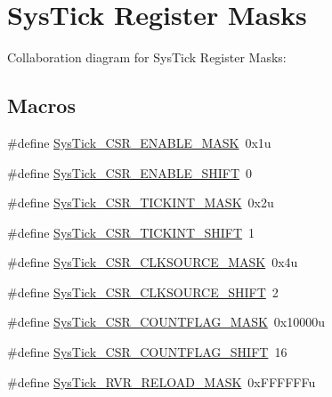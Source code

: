 \hypertarget{group___sys_tick___register___masks}{}\section{Sys\+Tick Register Masks}
\label{group___sys_tick___register___masks}
Collaboration diagram for Sys\+Tick Register Masks\+:
\subsection*{Macros}
\begin{DoxyCompactItemize}
\item 
\#define \hyperlink{group___sys_tick___register___masks_gac780b47ad7830f8b054650cf9ae10600}{Sys\+Tick\+\_\+\+C\+S\+R\+\_\+\+E\+N\+A\+B\+L\+E\+\_\+\+M\+A\+SK}~0x1u
\item 
\#define \hyperlink{group___sys_tick___register___masks_ga0f710afc23630b3797a50a76beec3418}{Sys\+Tick\+\_\+\+C\+S\+R\+\_\+\+E\+N\+A\+B\+L\+E\+\_\+\+S\+H\+I\+FT}~0
\item 
\#define \hyperlink{group___sys_tick___register___masks_ga8b51f1d83c7a482e111b09e4c5964a2b}{Sys\+Tick\+\_\+\+C\+S\+R\+\_\+\+T\+I\+C\+K\+I\+N\+T\+\_\+\+M\+A\+SK}~0x2u
\item 
\#define \hyperlink{group___sys_tick___register___masks_ga7fc911092251c68f56bc4d2e68ffa0b2}{Sys\+Tick\+\_\+\+C\+S\+R\+\_\+\+T\+I\+C\+K\+I\+N\+T\+\_\+\+S\+H\+I\+FT}~1
\item 
\#define \hyperlink{group___sys_tick___register___masks_ga7e5a1e63ec805119d87e8584a2404831}{Sys\+Tick\+\_\+\+C\+S\+R\+\_\+\+C\+L\+K\+S\+O\+U\+R\+C\+E\+\_\+\+M\+A\+SK}~0x4u
\item 
\#define \hyperlink{group___sys_tick___register___masks_ga99922ae5d9a4c34aa9e2c1673c65d8a4}{Sys\+Tick\+\_\+\+C\+S\+R\+\_\+\+C\+L\+K\+S\+O\+U\+R\+C\+E\+\_\+\+S\+H\+I\+FT}~2
\item 
\#define \hyperlink{group___sys_tick___register___masks_ga5ae827629fd47e5a050f706576f7b425}{Sys\+Tick\+\_\+\+C\+S\+R\+\_\+\+C\+O\+U\+N\+T\+F\+L\+A\+G\+\_\+\+M\+A\+SK}~0x10000u
\item 
\#define \hyperlink{group___sys_tick___register___masks_ga9764e4e8c4ee1b8383ec52f061bd1c87}{Sys\+Tick\+\_\+\+C\+S\+R\+\_\+\+C\+O\+U\+N\+T\+F\+L\+A\+G\+\_\+\+S\+H\+I\+FT}~16
\item 
\#define \hyperlink{group___sys_tick___register___masks_gaec96452b3f6bd6a6ca6496cbbad9a9aa}{Sys\+Tick\+\_\+\+R\+V\+R\+\_\+\+R\+E\+L\+O\+A\+D\+\_\+\+M\+A\+SK}~0x\+F\+F\+F\+F\+F\+Fu

\end{DoxyCompactItemize}
